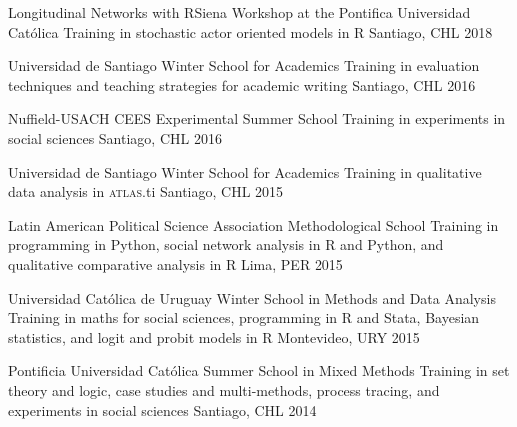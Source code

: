 \vspace{1mm}

\begin{cvhonors}
\cvhonor
{Longitudinal Networks with RSiena Workshop at the Pontifica Universidad Cat\'olica}
{Training in stochastic actor oriented models in R}
{Santiago, CHL}
{2018}
\end{cvhonors}

\vspace{1mm}

\begin{cvhonors}
\cvhonor
{Universidad de Santiago Winter School for Academics}
{Training in evaluation techniques and teaching strategies for academic writing}
{Santiago, CHL}
{2016}
\end{cvhonors}

\vspace{1mm}

\begin{cvhonors}
\cvhonor
{Nuffield-USACH CEES Experimental Summer School}
{Training in experiments in social sciences}
{Santiago, CHL}
{2016}
\end{cvhonors}

\vspace{1mm}

\begin{cvhonors}
\cvhonor
{Universidad de Santiago Winter School for Academics}
{Training in qualitative data analysis in {\scshape atlas}.ti}
{Santiago, CHL}
{2015}
\end{cvhonors}

\vspace{1mm}

\begin{cvhonors}
\cvhonor
{Latin American Political Science Association Methodological School}
{Training in programming in Python, social network analysis in R and Python, and qualitative comparative analysis in R}
{Lima, PER}
{2015}
\end{cvhonors}

\vspace{1mm}

\begin{cvhonors}
\cvhonor
{Universidad Católica de Uruguay Winter School in Methods and Data Analysis}
{Training in maths for social sciences, programming in R and Stata, Bayesian statistics, and logit and probit models in R}
{Montevideo, URY}
{2015}
\end{cvhonors}

\vspace{1mm}

\begin{cvhonors}
\cvhonor
{Pontificia Universidad Católica Summer School in Mixed Methods}
{Training in set theory and logic, case studies and multi-methods, process tracing, and experiments in social sciences}
{Santiago, CHL}
{2014}
\end{cvhonors}

\vspace{1mm}
